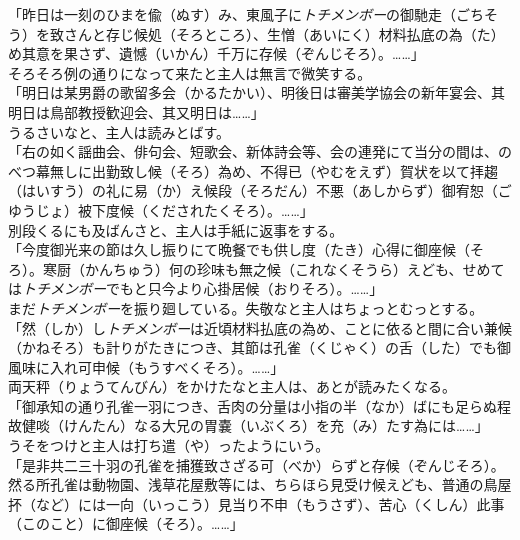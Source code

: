 \documentclass{book}
\begin{document}
「昨日は一刻のひまを偸（ぬす）み、東風子に\emph{トチメンボー}の御馳走（ごちそう）を致さんと存じ候処（そろところ）、生憎（あいにく）材料払底の為（た）め其意を果さず、遺憾（いかん）千万に存候（ぞんじそろ）。\ldots{}\ldots{}」\\

そろそろ例の通りになって来たと主人は無言で微笑する。\\

「明日は某男爵の歌留多会（かるたかい）、明後日は審美学協会の新年宴会、其明日は鳥部教授歓迎会、其又明日は\ldots{}\ldots{}」\\

うるさいなと、主人は読みとばす。\\

「右の如く謡曲会、俳句会、短歌会、新体詩会等、会の連発にて当分の間は、のべつ幕無しに出勤致し候（そろ）為め、不得已（やむをえず）賀状を以て拝趨（はいすう）の礼に易（か）え候段（そろだん）不悪（あしからず）御宥恕（ごゆうじょ）被下度候（くだされたくそろ）。\ldots{}\ldots{}」\\

別段くるにも及ばんさと、主人は手紙に返事をする。\\

「今度御光来の節は久し振りにて晩餐でも供し度（たき）心得に御座候（そろ）。寒厨（かんちゅう）何の珍味も無之候（これなくそうら）えども、せめては\emph{トチメンボー}でもと只今より心掛居候（おりそろ）。\ldots{}\ldots{}」\\

まだ\emph{トチメンボー}を振り廻している。失敬なと主人はちょっとむっとする。\\

「然（しか）し\emph{トチメンボー}は近頃材料払底の為め、ことに依ると間に合い兼候（かねそろ）も計りがたきにつき、其節は孔雀（くじゃく）の舌（した）でも御風味に入れ可申候（もうすべくそろ）。\ldots{}\ldots{}」\\

両天秤（りょうてんびん）をかけたなと主人は、あとが読みたくなる。\\

「御承知の通り孔雀一羽につき、舌肉の分量は小指の半（なか）ばにも足らぬ程故健啖（けんたん）なる大兄の胃嚢（いぶくろ）を充（み）たす為には\ldots{}\ldots{}」\\

うそをつけと主人は打ち遣（や）ったようにいう。\\

「是非共二三十羽の孔雀を捕獲致さざる可（べか）らずと存候（ぞんじそろ）。然る所孔雀は動物園、浅草花屋敷等には、ちらほら見受け候えども、普通の鳥屋抔（など）には一向（いっこう）見当り不申（もうさず）、苦心（くしん）此事（このこと）に御座候（そろ）。\ldots{}\ldots{}」\\
\end{document}

